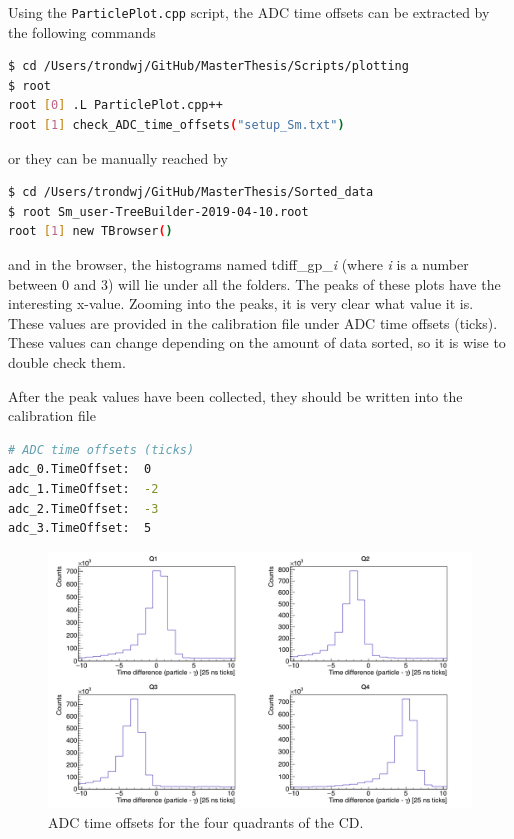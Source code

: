 \documentclass[twoside,english]{uiofysmaster/uiofysmaster}
\begin{document}
Using the \texttt{ParticlePlot.cpp} script, the ADC time offsets can be extracted by the following commands
\begin{lstlisting}[language=sh]
$ cd /Users/trondwj/GitHub/MasterThesis/Scripts/plotting
$ root
root [0] .L ParticlePlot.cpp++
root [1] check_ADC_time_offsets("setup_Sm.txt")
\end{lstlisting}
or they can be manually reached by
\begin{lstlisting}[language=sh]
$ cd /Users/trondwj/GitHub/MasterThesis/Sorted_data
$ root Sm_user-TreeBuilder-2019-04-10.root
root [1] new TBrowser()
\end{lstlisting}
and in the browser, the histograms named tdiff\_gp\_\textit{i} (where \textit{i} is a number between 0 and 3) will lie under all the folders. The peaks of these plots have the interesting x-value. Zooming into the peaks, it is very clear what value it is. These values are provided in the calibration file under ADC time offsets (ticks). These values can change depending on the amount of data sorted, so it is wise to double check them.

After the peak values have been collected, they should be written into the calibration file
\begin{lstlisting}[language=sh]
# ADC time offsets (ticks)
adc_0.TimeOffset:  0
adc_1.TimeOffset:  -2
adc_2.TimeOffset:  -3
adc_3.TimeOffset:  5
\end{lstlisting}

\begin{figure}[ht]
	\centering
	\includegraphics[width=\textwidth]{../Plots/plotting/tdiff_gp_0-3-user.png}
	\caption{ADC time offsets for the four quadrants of the CD.}
	\label{fig:ADC_dt}
\end{figure}
\end{document}

